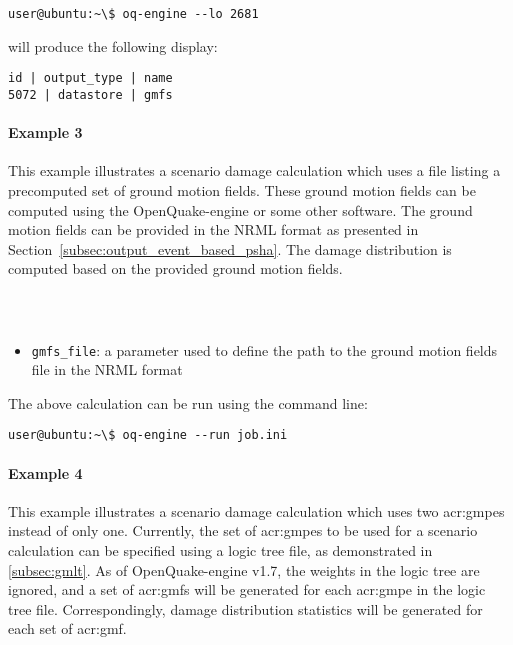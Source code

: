 \begin{Verbatim}[frame=single, commandchars=\\\{\}, samepage=true]
user@ubuntu:~\$ oq-engine --lo 2681
\end{Verbatim}

will produce the following display:

\begin{Verbatim}[frame=single, commandchars=\\\{\}, samepage=true]
  id | output_type | name
5072 | datastore | gmfs
\end{Verbatim}


\paragraph{Example 3}

This example illustrates a scenario damage calculation which uses a file
listing a precomputed set of ground motion fields. These ground motion fields
can be computed using the OpenQuake-engine or some other software. The ground
motion fields can be provided in the NRML format as presented in
Section~\ref{subsec:output_event_based_psha}. The damage distribution is
computed based on the provided ground motion fields.

\inputminted[firstline=1,firstnumber=1,fontsize=\footnotesize,frame=single,linenos,bgcolor=lightgray,label=job.ini]{ini}{oqum/risk/verbatim/config_scenario_damage_gmf.ini}\\

\begin{itemize}

  \item \Verb+gmfs_file+: a parameter used to define the path
	  to the ground motion fields file in the NRML format

\end{itemize}

The above calculation can be run using the command line:

\begin{Verbatim}[frame=single, commandchars=\\\{\}, samepage=true]
user@ubuntu:~\$ oq-engine --run job.ini
\end{Verbatim}


\paragraph{Example 4}

This example illustrates a scenario damage calculation which uses two
\glspl{acr:gmpe} instead of only one. Currently, the set of \glspl{acr:gmpe}
to be used for a scenario calculation can be specified using a logic tree
file, as demonstrated in \ref{subsec:gmlt}. As of OpenQuake-engine v1.7, the
weights in the logic tree are ignored, and a set of \glspl{acr:gmf} will be
generated for each \gls{acr:gmpe} in the logic tree file. Correspondingly,
damage distribution statistics will be generated for each set of
\gls{acr:gmf}.


